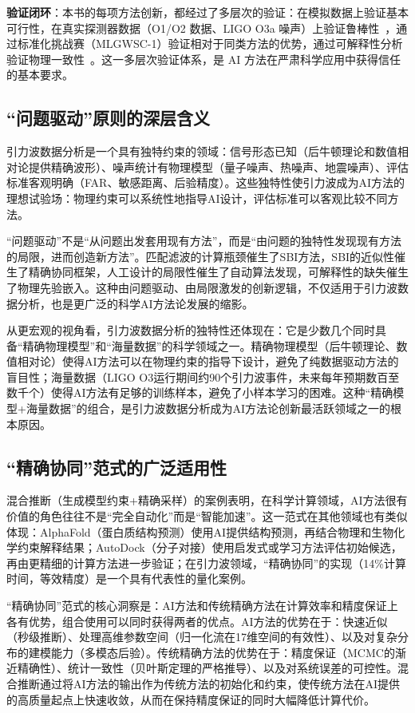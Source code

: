 \textbf{验证闭环}：本书的每项方法创新，都经过了多层次的验证：在模拟数据上验证基本可行性，在真实探测器数据（O1/O2 数据、LIGO O3a 噪声）上验证鲁棒性~\cite{schafer2023mlgwsc1}，通过标准化挑战赛（MLGWSC-1）验证相对于同类方法的优势，通过可解释性分析验证物理一致性~\cite{tian2025cnn}。这一多层次验证体系，是 AI 方法在严肃科学应用中获得信任的基本要求。

\subsection{“问题驱动”原则的深层含义}

引力波数据分析是一个具有独特约束的领域：信号形态已知（后牛顿理论和数值相对论提供精确波形）、噪声统计有物理模型（量子噪声、热噪声、地震噪声）、评估标准客观明确（FAR、敏感距离、后验精度）。这些独特性使引力波成为AI方法的理想试验场：物理约束可以系统性地指导AI设计，评估标准可以客观比较不同方法。

“问题驱动”不是“从问题出发套用现有方法”，而是“由问题的独特性发现现有方法的局限，进而创造新方法”。匹配滤波的计算瓶颈催生了SBI方法，SBI的近似性催生了精确协同框架，人工设计的局限性催生了自动算法发现，可解释性的缺失催生了物理先验嵌入。这种由问题驱动、由局限激发的创新逻辑，不仅适用于引力波数据分析，也是更广泛的科学AI方法论发展的缩影。

从更宏观的视角看，引力波数据分析的独特性还体现在：它是少数几个同时具备“精确物理模型”和“海量数据”的科学领域之一。精确物理模型（后牛顿理论、数值相对论）使得AI方法可以在物理约束的指导下设计，避免了纯数据驱动方法的盲目性；海量数据（LIGO O3运行期间约90个引力波事件，未来每年预期数百至数千个）使得AI方法有足够的训练样本，避免了小样本学习的困难。这种“精确模型+海量数据”的组合，是引力波数据分析成为AI方法论创新最活跃领域之一的根本原因。

\subsection{“精确协同”范式的广泛适用性}

混合推断（生成模型约束+精确采样）的案例表明，在科学计算领域，AI方法很有价值的角色往往不是“完全自动化”而是“智能加速”。这一范式在其他领域也有类似体现：AlphaFold（蛋白质结构预测）使用AI提供结构预测，再结合物理和生物化学约束解释结果；AutoDock（分子对接）使用启发式或学习方法评估初始候选，再由更精细的计算方法进一步验证；在引力波领域，“精确协同”的实现（14\%计算时间，等效精度）是一个具有代表性的量化案例。

“精确协同”范式的核心洞察是：AI方法和传统精确方法在计算效率和精度保证上各有优势，组合使用可以同时获得两者的优点。AI方法的优势在于：快速近似（秒级推断）、处理高维参数空间（归一化流在17维空间的有效性）、以及对复杂分布的建模能力（多模态后验）。传统精确方法的优势在于：精度保证（MCMC的渐近精确性）、统计一致性（贝叶斯定理的严格推导）、以及对系统误差的可控性。混合推断通过将AI方法的输出作为传统方法的初始化和约束，使传统方法在AI提供的高质量起点上快速收敛，从而在保持精度保证的同时大幅降低计算代价。

